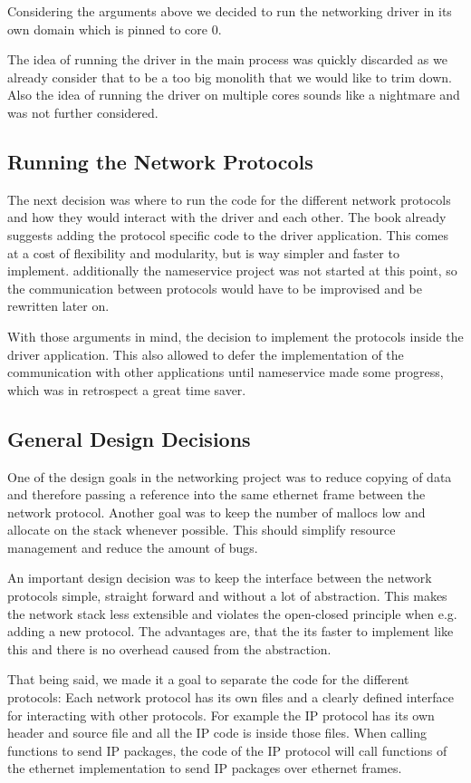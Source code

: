 Considering the arguments above we decided to run the networking driver in its own domain which is pinned to core 0.

The idea of running the driver in the main process was quickly discarded as we already consider that to be a too big monolith that we would like to trim down. Also the idea of running the driver on multiple cores sounds like a nightmare and was not further considered.

\subsection{Running the Network Protocols}

The next decision was where to run the code for the different network protocols and how they would interact with the driver and each other. The book already suggests adding the protocol specific code to the driver application. This comes at a cost of flexibility and modularity, but is way simpler and faster to implement. additionally the nameservice project was not started at this point, so the communication between protocols would have to be improvised and be rewritten later on.

With those arguments in mind, the decision to implement the protocols inside the driver application. This also allowed to defer the implementation of the communication with other applications until nameservice made some progress, which was in retrospect a great time saver.

\subsection{General Design Decisions}

One of the design goals in the networking project was to reduce copying of data and therefore passing a reference into the same ethernet frame between the network protocol. Another goal was to keep the number of mallocs low and allocate on the stack whenever possible. This should simplify resource management and reduce the amount of bugs.

An important design decision was to keep the interface between the network protocols simple, straight forward and without a lot of abstraction. This makes the network stack less extensible and violates the open-closed principle when e.g. adding a new protocol. The advantages are, that the its faster to implement like this and there is no overhead caused from the abstraction.

That being said, we made it a goal to separate the code for the different protocols: Each network protocol has its own files and a clearly defined interface for interacting with other protocols. For example the IP protocol has its own header and source file and all the IP code is inside those files. When calling functions to send IP packages, the code of the IP protocol will call functions of the ethernet implementation to send IP packages over ethernet frames.

